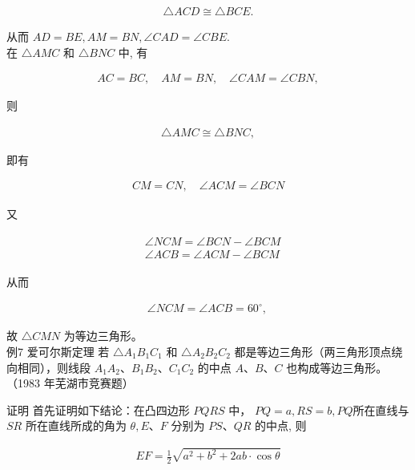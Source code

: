 \documentclass[10pt]{article}
\begin{document}
\begin{align*}
\triangle A C D \cong \triangle B C E .
\end{align*}

从而 $A D=B E, A M=B N, \angle C A D=\angle C B E$.\\
在 $\triangle A M C$ 和 $\triangle B N C$ 中, 有

\begin{align*}
A C=B C, \quad A M=B N, \quad \angle C A M=\angle C B N,
\end{align*}

则

\begin{align*}
\triangle A M C \cong \triangle B N C,
\end{align*}

即有

\begin{align*}
C M=C N, \quad \angle A C M=\angle B C N
\end{align*}

又

\begin{align*}
\begin{aligned}
& \angle N C M=\angle B C N-\angle B C M \\
& \angle A C B=\angle A C M-\angle B C M
\end{aligned}
\end{align*}

从而

\begin{align*}
\angle N C M=\angle A C B=60^{\circ} \text {, }
\end{align*}

故 $\triangle C M N$ 为等边三角形。\\
例7 爱可尔斯定理 若 $\triangle A_{1} B_{1} C_{1}$ 和 $\triangle A_{2} B_{2} C_{2}$ 都是等边三角形（两三角形顶点绕向相同），则线段 $A_{1} A_{2} 、 B_{1} B_{2} 、 C_{1} C_{2}$ 的中点 $A 、 B 、 C$ 也构成等边三角形。（1983 年芜湖市竞赛题）

证明 首先证明如下结论：在凸四边形 $P Q R S$ 中， $P Q=a, R S=b, P Q$所在直线与 $S R$ 所在直线所成的角为 $\theta, E 、 F$ 分别为 $P S 、 Q R$ 的中点, 则

\begin{align*}
E F=\frac{1}{2} \sqrt{a^{2}+b^{2}+2 a b \cdot \cos \theta}
\end{align*}
\end{document}
